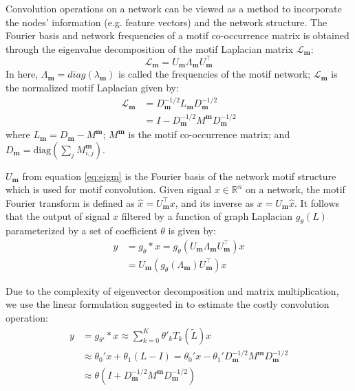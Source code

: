 \documentclass{article}
\theoremstyle{definition}
\begin{document}
Convolution operations on a network can be viewed as a method to
incorporate the nodes' information (e.g. feature vectors) 
and the network structure. The Fourier basis and network frequencies of
a motif co-occurrence matrix is obtained through the eigenvalue
decomposition of the motif Laplacian matrix $\mathcal{L}_{\mathbf{m}}$:
\begin{equation} \label{eq:eigm}
\mathcal{L}_{\mathbf{m}} = U_{\mathbf{m}} \Lambda_{\mathbf{m}} 
U^{\top}_{\mathbf{m}}
\end{equation}
In here, $\Lambda_{\mathbf{m}} = diag(\lambda_{\mathbf{m}})$ is called the 
frequencies of the motif network; $\mathcal{L}_{\mathbf{m}}$ is the 
normalized motif Laplacian given by:
\begin{equation} \label{eq:eigm}
\begin{aligned}
\mathcal{L}_{\mathbf{m}} &= D_{\mathbf{m}}^{-1/2} L_{\mathbf{m}} 
D_{\mathbf{m}}^{-1/2} \\
&= I - D_{\mathbf{m}}^{-1/2} M^{\mathbf{m}} D_{\mathbf{m}}^{-1/2}
\end{aligned}
\end{equation}
where $L_{\mathbf{m}} = D_{\mathbf{m}} - M^{\mathbf{m}}$; $M^{\mathbf{m}}$
is the motif co-occurrence matrix; and $D_{\mathbf{m}} = \mbox{diag} 
( \sum_j M^{\mathbf{m}}_{i,j} )$.

$U_{\mathbf{m}}$ from equation \ref{eq:eigm} is the Fourier basis of the 
network motif structure which is used for motif convolution. Given signal
$x \in \mathds{R}^n$ on a network, the motif Fourier transform is defined
as $\hat{x} = U_{\mathbf{m}}^{\top}x$, and its inverse as 
$x = U_{\mathbf{m}}\hat{x}$. It follows that the output of signal $x$
filtered by a function of graph Laplacian $g_{\theta}(L)$ parameterized
by a set of coefficient $\theta$ is given by:
\begin{equation} \label{eq:filter}
\begin{aligned}
y &= g_{\theta} \ast x =  g_\theta (U_{\mathbf{m}} \Lambda_{\mathbf{m}} U_{\mathbf{m}}^\top) x \\
&= U_{\mathbf{m}} (g_\theta(\Lambda_{\mathbf{m}}) U^\top_{\mathbf{m}})x
\end{aligned}
\end{equation}   

Due to the complexity of eigenvector decomposition and matrix 
multiplication, we use the linear formulation suggested in \cite{gcn} to 
estimate the costly convolution operation: 
\begin{equation} \label{eq:linear}
\begin{aligned}
y &= g_{\theta'} \ast x \approx \sum_{k=0}^K \theta'_k T_k(\tilde{L})x \\
&\approx \theta_0' x + \theta_1 (L - I) = \theta_0' x - \theta_1' D^{-1/2}_{\mathbf{m}}
M^{\mathbf{m}}D^{-1/2}_{\mathbf{m}} \\
&\approx \theta \left( I + D^{-1/2}_{\mathbf{m}}
M^{\mathbf{m}}D^{-1/2}_{\mathbf{m}} \right)
\end{aligned}
\end{equation} 
\end{document}

